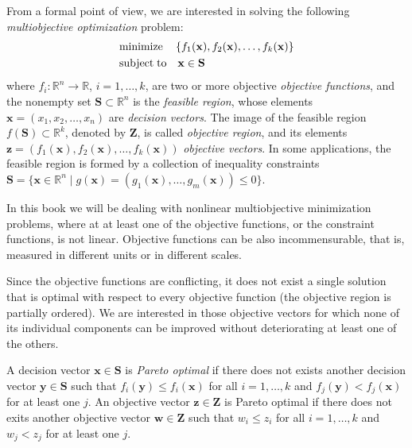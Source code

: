 {From a formal point of view, we are interested in solving the following \emph{multiobjective optimization} problem:
\begin{align*}
     & \text{minimize}	  \quad \left\{f_1(\mathbf{x}), f_2(\mathbf{x}), \ldots, f_k(\mathbf{x}) \right\} \\
     & \text{subject\;to} \quad \mathbf{x} \in \mathbf{S}
\end{align*}
where $f_i:\mathbb{R}^n \rightarrow \mathbb{R}$, $i = 1, \ldots, k$, are two or more objective \emph{objective functions}, and the nonempty set $\mathbf{S} \subset \mathbb{R}^n$ is the \emph{feasible region}, whose elements $\mathbf{x} = \left( x_1, x_2, \ldots, x_n \right)$ are \emph{decision vectors}. The image of the feasible region $f(\mathbf{S}) \subset \mathbb{R}^k$, denoted by $\mathbf{Z}$, is called \emph{objective region}, and its elements $\mathbf{z} = \left(f_1(\mathbf{x}), f_2(\mathbf{x}), \ldots, f_k(\mathbf{x}) \right)$ \emph{objective vectors}. In some applications, the feasible region is formed by a collection of inequality constraints $\mathbf{S} = \{ \mathbf{x} \in \mathbb{R}^n \mid g(\mathbf{x}) = \left( g_1(\mathbf{x}), \ldots, g_m(\mathbf{x}) \right) \leq 0 \}$.

In this book we will be dealing with nonlinear multiobjective minimization problems, where at at least one of the objective functions, or the constraint functions, is not linear. Objective functions can be also incommensurable, that is, measured in different units or in different scales.

Since the objective functions are conflicting, it does not exist a single solution that is optimal with respect to every objective function (the objective region is partially ordered). We are interested in those objective vectors for which none of its individual components can be improved without deteriorating at least one of the others.

\begin{definition}
A decision vector $\mathbf{x} \in \mathbf{S}$ is \emph{Pareto optimal} if there does not exists another decision vector $\mathbf{y} \in \mathbf{S}$ such that $f_i(\mathbf{y}) \leq f_i(\mathbf{x})$ for all $i = 1, \ldots, k$ and $f_j(\mathbf{y}) < f_j(\mathbf{x})$ for at least one $j$. An objective vector $\mathbf{z} \in \mathbf{Z}$ is Pareto optimal if there does not exits another objective vector $\mathbf{w} \in \mathbf{Z}$ such that $w_i \leq z_i$ for all $i = 1, \ldots, k$ and $w_j < z_j$ for at least one $j$.
\end{definition}

}
